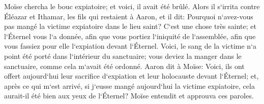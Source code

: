 \verse Moïse chercha le bouc expiatoire; et voici, il avait été brûlé. Alors il s`irrita contre Éléazar et Ithamar, les fils qui restaient à Aaron, et il dit: 
\verse Pourquoi n`avez-vous pas mangé la victime expiatoire dans le lieu saint? C`est une chose très sainte; et l`Éternel vous l`a donnée, afin que vous portiez l`iniquité de l`assemblée, afin que vous fassiez pour elle l`expiation devant l`Éternel. 
\verse Voici, le sang de la victime n`a point été porté dans l`intérieur du sanctuaire; vous deviez la manger dans le sanctuaire, comme cela m`avait été ordonné. 
\verse Aaron dit à Moïse: Voici, ils ont offert aujourd`hui leur sacrifice d`expiation et leur holocauste devant l`Éternel; et, après ce qui m`est arrivé, si j`eusse mangé aujourd`hui la victime expiatoire, cela aurait-il été bien aux yeux de l`Éternel? 
\verse Moïse entendit et approuva ces paroles. 

\chapter{}

